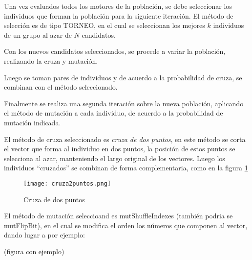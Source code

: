 Una vez evaluados todos los motores de la población, se debe seleccionar los
individuos que forman la población para la siguiente iteración.
%
El método de selección es de tipo TORNEO, en el cual se seleccionan los mejores
$k$ individuos de un grupo al azar de $N$ candidatos.
%

Con los nuevos candidatos seleccionados, se procede a variar la población,
realizando la cruza y mutación.

Luego se toman pares de individuos y de acuerdo a la probabilidad de cruza, se
combinan con el método seleccionado.

Finalmente se realiza una segunda iteración sobre la nueva población, aplicando
el método de mutación a cada individuo, de acuerdo a la probabilidad de
mutación indicada.


El método de cruza seleccionado es \emph{cruza de dos puntos}, en este método
se corta el vector que forma al individuo en dos puntos, la posición de estos
puntos se selecciona al azar, manteniendo el largo original de los vectores.
%
Luego los individuos ``cruzados'' se combinan de forma complementaria, como en
la figura \ref{fig:cr2puntos}

\begin{figure}
  \centering
  \texttt{[image: cruza2puntos.png]}
  \caption{Cruza de dos puntos}
  \label{fig:cr2puntos}
\end{figure}

%
%
%
%
%

El método de mutación seleccioand es mutShuffleIndexes (también podria se
mutFlipBit), en el cual se modifica el orden los números que componen al vector,
dando lugar a por ejemplo:

(figura con ejemplo)
